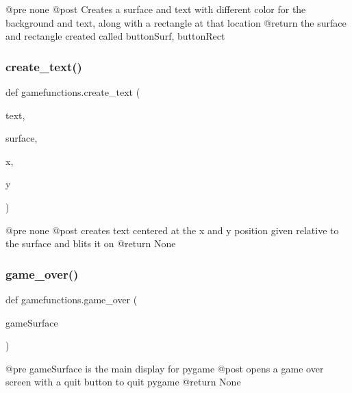 \begin{DoxyVerb}@pre    none
    @post   Creates a surface and text with different color for the background and text, along with a rectangle at that location
    @return the surface and rectangle created called buttonSurf, buttonRect
\end{DoxyVerb}
 \mbox{\label{namespacegamefunctions_aad080841b3df3284089074d16588ed82}} 
\subsubsection{\texorpdfstring{create\+\_\+text()}{create\_text()}}
{\footnotesize\ttfamily def gamefunctions.\+create\+\_\+text (\begin{DoxyParamCaption}\item[{}]{text,  }\item[{}]{surface,  }\item[{}]{x,  }\item[{}]{y }\end{DoxyParamCaption})}

\begin{DoxyVerb}@pre    none
    @post   creates text centered at the x and y position given relative to the surface and blits it on
    @return None
\end{DoxyVerb}
 \mbox{\label{namespacegamefunctions_a08a81f3d3aebb362a637fa900ca9af5c}} 
\subsubsection{\texorpdfstring{game\+\_\+over()}{game\_over()}}
{\footnotesize\ttfamily def gamefunctions.\+game\+\_\+over (\begin{DoxyParamCaption}\item[{}]{game\+Surface }\end{DoxyParamCaption})}

\begin{DoxyVerb}@pre    gameSurface is the main display for pygame
    @post   opens a game over screen with a quit button to quit pygame
    @return None
\end{DoxyVerb}
 \mbox{\label{namespacegamefunctions_acf46cabff90f0d1e06c4aadc3865292a}} 
